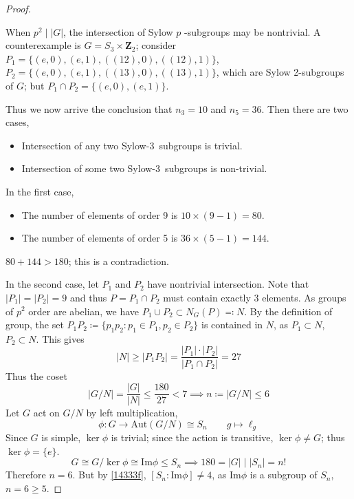 \begin{proof}
\begin{remark}
When $p^2\mid \lvert G \rvert$, the intersection of Sylow $p$ -subgroups may be nontrivial. A counterexample is $G=S_3\times \mathbf{Z}_{2}$; consider $P_1=\{ (e,0),(e,1),((12),0),((12),1) \}$, $P_2=\{ (e,0),(e,1),((13),0),((13),1) \}$, which are Sylow 2-subgroups of $G$; but $P_1\cap P_2=\{ (e,0),(e,1) \}$.
\end{remark}
Thus we now arrive the conclusion that $n_3=10$ and $n_5=36$. Then there are two cases,

\begin{itemize}
	\item Intersection of any two Sylow-3 subgroups is trivial.
	\item Intersection of some two Sylow-3 subgroups is non-trivial.
\end{itemize}

In the first case,

\begin{itemize}
	\item The number of elements of order 9 is $10\times(9-1)=80$.
	\item The number of elements of order 5 is $36\times(5-1)=144$.
\end{itemize}

$80+144>180$; this is a contradiction.

In the second case, let $P_1$ and $P_2$ have nontrivial intersection. Note that $\lvert P_1 \rvert=\lvert P_2 \rvert=9$ and thus $P=P_1\cap P_2$ must contain exactly 3 elements. As groups of $p^2$ order are abelian, we have $P_1\cup P_2\subset N_{G}(P)\eqqcolon N$. By the definition of group, the set $P_1P_2\coloneqq \{ p_1p_2:p_1\in P_1,p_2\in P_2 \}$ is contained in $N$, as $P_1\subset N$, $P_2\subset N$. This gives
\[
\lvert N \rvert \geq \lvert P_1P_2 \rvert =\frac{\lvert P_1 \rvert \cdot \lvert P_2 \rvert  }{\lvert P_1\cap P_2 \rvert }=27
\]
Thus the coset
\[
\lvert G/N \rvert =\frac{\lvert G \rvert }{\lvert N \rvert }\leq \frac{180}{27}<7\implies n\coloneqq  \lvert G/N  \rvert\leq 6 
\]
Let $G$ act on $G/N$ by left multiplication,
\[
\phi:G\to \mathrm{Aut}(G/N )\cong S_n\qquad g\mapsto \ell_{g}
\]
Since $G$ is simple, $\ker \phi$ is trivial; since the action is transitive, $\ker \phi\neq G$; thus $\ker \phi=\{ e \}$.
\[
G\cong G/\ker \phi \cong \mathrm{Im}\phi \leq S_n\implies 180= \lvert G \rvert \mid \lvert S_n \rvert =n!
\]
Therefore $n=6$. But by \cref{14333f}, $[S_n:\mathrm{Im}\phi]\neq4$, as $\mathrm{Im}\phi$ is a subgroup of $S_n$, $n=6\geq5$.

\end{proof}

